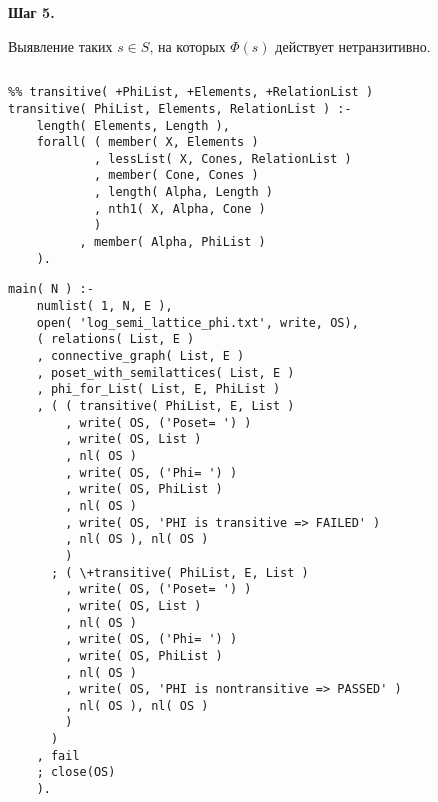 \documentclass{beamer}
\newcommand{\retline}{

$ $

}
\begin{document}
\begin{frame}[fragile]
{\bf Шаг 5.}

Выявление таких $s \in S$, на которых $\Phi(s)$  действует нетранзитивно.
{\retline}

{\scriptsize
\begin{lstlisting}
%% transitive( +PhiList, +Elements, +RelationList )
transitive( PhiList, Elements, RelationList ) :-
    length( Elements, Length ),
    forall( ( member( X, Elements )
            , lessList( X, Cones, RelationList )
            , member( Cone, Cones )
            , length( Alpha, Length )
            , nth1( X, Alpha, Cone )
            )
          , member( Alpha, PhiList )
	).
\end{lstlisting}
}
\end{frame}

\begin{frame}[fragile]

{\tiny
\begin{lstlisting}
main( N ) :-
    numlist( 1, N, E ),
    open( 'log_semi_lattice_phi.txt', write, OS),
    ( relations( List, E )
    , connective_graph( List, E )
    , poset_with_semilattices( List, E )
    , phi_for_List( List, E, PhiList )
    , ( ( transitive( PhiList, E, List )
        , write( OS, ('Poset= ') )
        , write( OS, List )
        , nl( OS )
        , write( OS, ('Phi= ') )
        , write( OS, PhiList )
        , nl( OS )
        , write( OS, 'PHI is transitive => FAILED' )
        , nl( OS ), nl( OS )
        )
      ; ( \+transitive( PhiList, E, List )
        , write( OS, ('Poset= ') )
        , write( OS, List )
        , nl( OS )
        , write( OS, ('Phi= ') )
        , write( OS, PhiList )
        , nl( OS )
        , write( OS, 'PHI is nontransitive => PASSED' )
        , nl( OS ), nl( OS )
        )
      )
    , fail
    ; close(OS)
    ).

\end{lstlisting}
}
\end{frame}
\end{document}

